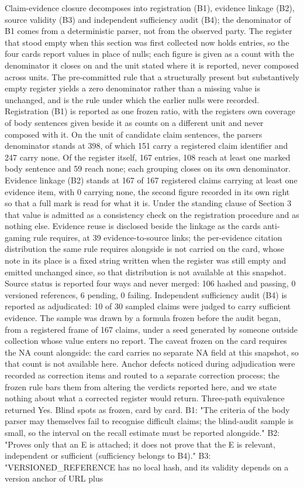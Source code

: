 \documentclass[
  english,
]{article}
\begin{document}
Claim-evidence closure decomposes into registration (B1), evidence linkage (B2), source validity (B3) and independent sufficiency audit (B4); the denominator of B1 comes from a deterministic parser, not from the observed party. The register that stood empty when this section was first collected now holds entries, so the four cards report values in place of nulls; each figure is given as a count with the denominator it closes on and the unit stated where it is reported, never composed across units. The pre-committed rule that a structurally present but substantively empty register yields a zero denominator rather than a missing value is unchanged, and is the rule under which the earlier nulls were recorded. Registration (B1) is reported as one frozen ratio, with the register\textquotesingle s own coverage of body sentences given beside it as counts on a different unit and never composed with it. On the unit of candidate claim sentences, the parser\textquotesingle s denominator stands at 398, of which 151 carry a registered claim identifier and 247 carry none. Of the register itself, 167 entries, 108 reach at least one marked body sentence and 59 reach none; each grouping closes on its own denominator. Evidence linkage (B2) stands at 167 of 167 registered claims carrying at least one evidence item, with 0 carrying none, the second figure recorded in its own right so that a full mark is read for what it is. Under the standing clause of Section 3 that value is admitted as a consistency check on the registration procedure and as nothing else. Evidence reuse is disclosed beside the linkage as the card\textquotesingle s anti-gaming rule requires, at 39 evidence-to-source links; the per-evidence citation distribution the same rule requires alongside is not carried on the card, whose note in its place is a fixed string written when the register was still empty and emitted unchanged since, so that distribution is not available at this snapshot. Source status is reported four ways and never merged: 106 hashed and passing, 0 versioned references, 6 pending, 0 failing. Independent sufficiency audit (B4) is reported as adjudicated: 10 of 30 sampled claims were judged to carry sufficient evidence. The sample was drawn by a formula frozen before the audit began, from a registered frame of 167 claims, under a seed generated by someone outside collection whose value enters no report. The caveat frozen on the card requires the NA count alongside: the card carries no separate NA field at this snapshot, so that count is not available here. Anchor defects noticed during adjudication were recorded as correction items and routed to a separate correction process; the frozen rule bars them from altering the verdicts reported here, and we state nothing about what a corrected register would return. Three-path equivalence returned Yes. Blind spots as frozen, card by card. B1: "The criteria of the body parser may themselves fail to recognise difficult claims; the blind-audit sample is small, so the interval on the recall estimate must be reported alongside." B2: "Proves only that an E is attached; it does not prove that the E is relevant, independent or sufficient (sufficiency belongs to B4)." B3: "VERSIONED\_REFERENCE has no local hash, and its validity depends on a version anchor of URL plus 
\end{document}

